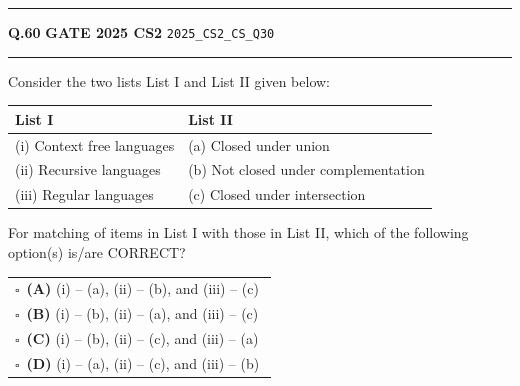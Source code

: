 \documentclass[a4paper,10pt]{article}
\begin{document}
\vspace{6pt}\hrule height 0.35pt\vspace{6pt}
\noindent
\begin{tcolorbox}[
    blanker,
    sidebyside,
    sidebyside align=top,
    lefthand width=0.55\textwidth,
    top=4pt, bottom=4pt, left=0pt, right=0pt,
    middle=16pt,
    underlay={
        \draw[dashed, black!80, line width=0.8pt, dash pattern=on 4pt off 3pt]
            ([xshift=0.55\textwidth+8pt]frame.north west) --
            ([xshift=0.55\textwidth+8pt]frame.south west);
    }
]
\textbf{Q.60}  \hfill {\footnotesize\textbf{GATE 2025 CS2} \quad \tiny\texttt{2025\_CS2\_CS\_Q30}}
\vspace{2pt}\hrule height 0.3pt\vspace{4pt}

Consider the two lists List I and List II given below:
\par\medskip
\begin{center}\small
\begin{tabular}{ll}
\toprule
List I & List II \\
\midrule
(i) Context free languages & (a) Closed under union \\
(ii) Recursive languages & (b) Not closed under complementation \\
(iii) Regular languages & (c) Closed under intersection \\
\bottomrule
\end{tabular}\end{center}
\par\medskip
For matching of items in List I with those in List II, which of the following option(s) is/are CORRECT?

\par\vspace{6pt}\noindent
\begin{tabular}{@{}p{0.98\linewidth}@{}}
$\square$\ \textbf{(A)} (i) – (a), (ii) – (b), and (iii) – (c) \\
\addlinespace[3pt]
$\square$\ \textbf{(B)} (i) – (b), (ii) – (a), and (iii) – (c) \\
\addlinespace[3pt]
$\square$\ \textbf{(C)} (i) – (b), (ii) – (c), and (iii) – (a) \\
\addlinespace[3pt]
$\square$\ \textbf{(D)} (i) – (a), (ii) – (c), and (iii) – (b)
\end{tabular}

\tcblower


\end{tcolorbox}
\end{document}
